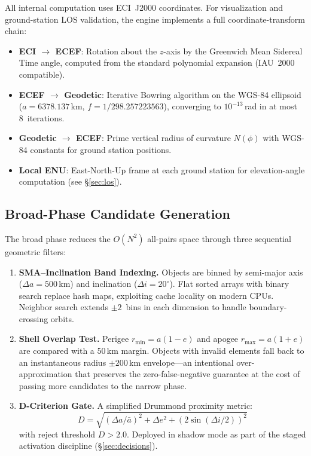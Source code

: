 \documentclass[10pt,twocolumn,letterpaper]{article}
\begin{document}
All internal computation uses ECI~J2000 coordinates.  For visualization
and ground-station LOS validation, the engine implements a full
coordinate-transform chain:

\begin{itemize}[nosep,leftmargin=*]
  \item \textbf{ECI $\to$ ECEF}: Rotation about the $z$-axis by the
    Greenwich Mean Sidereal Time angle, computed from the standard
    polynomial expansion (IAU~2000 compatible).
  \item \textbf{ECEF $\to$ Geodetic}: Iterative Bowring algorithm on the
    WGS-84 ellipsoid ($a = 6378.137$\,km, $f = 1/298.257223563$), converging
    to $10^{-13}$\,rad in at most 8~iterations.
  \item \textbf{Geodetic $\to$ ECEF}: Prime vertical radius of curvature
    $N(\phi)$ with WGS-84 constants for ground station positions.
  \item \textbf{Local ENU}: East-North-Up frame at each ground station for
    elevation-angle computation (see \S\ref{sec:los}).
\end{itemize}

\subsection{Broad-Phase Candidate Generation}

The broad phase reduces the $O(N^2)$ all-pairs space through three
sequential geometric filters:

\begin{enumerate}[nosep,leftmargin=*]
  \item \textbf{SMA--Inclination Band Indexing.}
    Objects are binned by semi-major axis ($\Delta a = 500$\,km) and
    inclination ($\Delta i = 20^{\circ}$).  Flat sorted arrays with binary
    search replace hash maps, exploiting cache locality on modern CPUs.
    Neighbor search extends $\pm 2$~bins in each dimension to handle
    boundary-crossing orbits.

  \item \textbf{Shell Overlap Test.}
    Perigee $r_{\min} = a(1-e)$ and apogee $r_{\max} = a(1+e)$ are
    compared with a 50\,km margin.  Objects with invalid elements fall back
    to an instantaneous radius $\pm 200$\,km envelope---an intentional
    over-approximation that preserves the zero-false-negative guarantee at
    the cost of passing more candidates to the narrow phase.

  \item \textbf{D-Criterion Gate.}
    A simplified Drummond proximity metric:
    \begin{equation}
      D = \sqrt{(\Delta a / \bar{a})^2 + \Delta e^2
          + (2\sin(\Delta i / 2))^2}
    \end{equation}
    with reject threshold $D > 2.0$.  Deployed in shadow mode as part of
    the staged activation discipline (\S\ref{sec:decisions}).
\end{enumerate}
\end{document}
